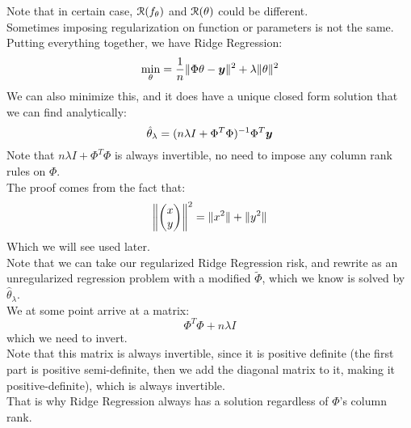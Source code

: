 \documentclass[12pt]{article}
\begin{document}
Note that in certain case, $\mathcal{R}(f_\theta)$
and $\mathcal{R}(\theta)$ could be different. \\
Sometimes imposing regularization on function
or parameters is not the same. \\

Putting everything together, we have Ridge Regression:
\[ \min_{\theta} = \dfrac{1}{n}
\|\Phi \theta - \boldsymbol{y}\|^2 
+ \lambda \|\theta\|^2 \]
We can also minimize this,
and it does have a unique closed form solution that
we can find analytically:
\[ \hat{\theta}_\lambda = 
(n\lambda I + \Phi^T\Phi)^{-1} \Phi^T\boldsymbol{y} \]
Note that $n\lambda I + \Phi^T\Phi$ is always
invertible, no need to impose any column rank
rules on $\Phi$. \\
The proof comes from the fact that:
\[ \left\| \begin{pmatrix} x \\ y \end{pmatrix} \right\|^2 
= \|x^2\| + \|y^2\| \]
Which we will see used later. \\

Note that we can take our regularized
Ridge Regression risk, and rewrite as an 
unregularized regression problem with a modified
$\tilde{\Phi}$, which we know is solved by 
$\hat{\theta}_\lambda$. \\
We at some point arrive at a matrix:
\[ \Phi^T\Phi + n \lambda I \]
which we need to invert. \\
Note that this matrix is always invertible,
since it is positive definite (the first
part is positive semi-definite,
then we add the diagonal matrix to it,
making it positive-definite),
which is always invertible. \\
That is why Ridge Regression always has a
solution regardless of $\Phi$'s column rank. \\
\end{document}
